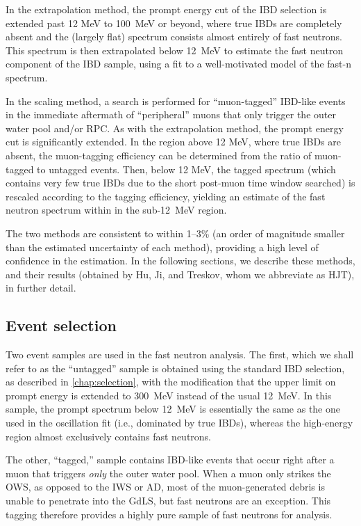 \documentclass[../thesis.tex]{subfiles}
\begin{document}
In the extrapolation method, the prompt energy cut of the IBD selection is extended past 12 MeV to 100~MeV or beyond, where true IBDs are completely absent and the (largely flat) spectrum consists almost entirely of fast neutrons. This spectrum is then extrapolated below 12~MeV to estimate the fast neutron component of the IBD sample, using a fit to a well-motivated model of the fast-n spectrum.

In the scaling method, a search is performed for ``muon-tagged'' IBD-like events in the immediate aftermath of ``peripheral'' muons that only trigger the outer water pool and/or RPC. As with the extrapolation method, the prompt energy cut is significantly extended. In the region above 12 MeV, where true IBDs are absent, the muon-tagging efficiency can be determined from the ratio of muon-tagged to untagged events. Then, below 12 MeV, the tagged spectrum (which contains very few true IBDs due to the short post-muon time window searched) is rescaled according to the tagging efficiency, yielding an estimate of the fast neutron spectrum within in the sub-12~MeV region.

The two methods are consistent to within 1--3\% (an order of magnitude smaller than the estimated uncertainty of each method), providing a high level of confidence in the estimation. In the following sections, we describe these methods, and their results (obtained by Hu, Ji, and Treskov, whom we abbreviate as HJT), in further detail.

\subsection{Event selection}
\label{sec:fastn_sel}

Two event samples are used in the fast neutron analysis. The first, which we shall refer to as the ``untagged'' sample is obtained using the standard IBD selection, as described in \autoref{chap:selection}, with the modification that the upper limit on prompt energy is extended to 300~MeV instead of the usual 12~MeV. In this sample, the prompt spectrum below 12~MeV is essentially the same as the one used in the oscillation fit (i.e., dominated by true IBDs), whereas the high-energy region almost exclusively contains fast neutrons.

The other, ``tagged,'' sample contains IBD-like events that occur right after a muon that triggers \emph{only} the outer water pool. When a muon only strikes the OWS, as opposed to the IWS or AD, most of the muon-generated debris is unable to penetrate into the GdLS, but fast neutrons are an exception. This tagging therefore provides a highly pure sample of fast neutrons for analysis.
\end{document}
